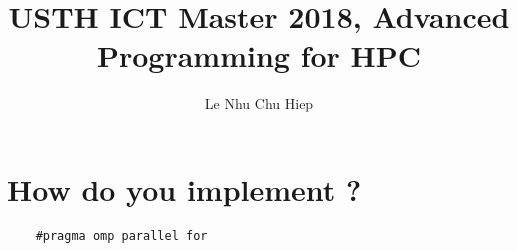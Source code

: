 \documentclass{article}
\title{USTH ICT Master 2018, Advanced Programming for HPC}
\author{Le Nhu Chu Hiep}
\date{}
\begin{document}
\section{How do you implement ?}
\begin{verbatim}
	#pragma omp parallel for
\end{verbatim}
\end{document}
